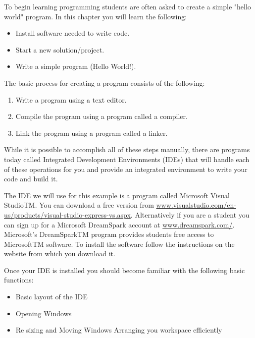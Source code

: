 
To begin learning programming students are often asked to create a simple "hello world" program. In this chapter you will learn the following:


\begin{itemize}
\item Install software needed to write code.
\item Start a new solution/project.
\item Write a simple program (Hello World!).
\end{itemize}

The basic process for creating a program consists of the following:
\begin{enumerate}
\item Write a program using a text editor.
\item Compile the program using a program called a compiler.
\item Link the program using a program called a linker.
\end{enumerate}
While it is possible to accomplish all of these steps manually, there are programs today called Integrated Development Environments (IDEs) that will handle each of these operations for you and provide an integrated environment to write your code and build it. 

The IDE we will use for this example is a program called Microsoft Visual Studio{TM}. 
You can download a free version from \url{www.visualstudio.com/en-us/products/visual-studio-express-vs.aspx}. 
Alternatively if you are a student you can sign up for a Microsoft DreamSpark account at \url{www.dreamspark.com/}.
Microsoft's DreamSpark{TM} program provides students free access to Microsoft{TM} software. To install the software follow the instructions on the website from which you download it.
 

Once your IDE is installed you should become familiar with the following basic functions:

\begin{itemize}
\item Basic layout of the IDE
\item Opening Windows
\item Re sizing and Moving Windows
\Item Arranging you workspace efficiently
\end{itemize}

